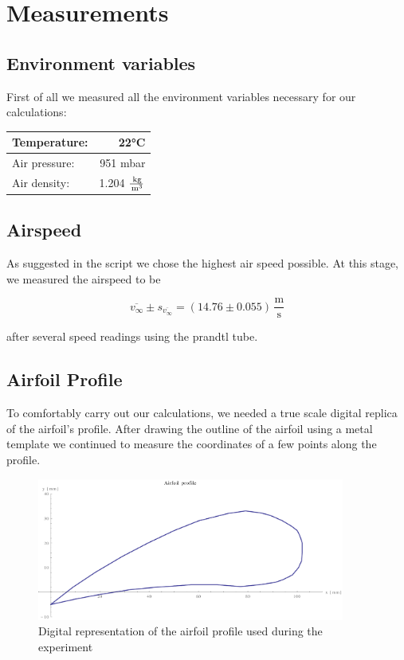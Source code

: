 \documentclass{scrreprt}
\newcommand{\unit}[1]{\ensuremath{\, \mathrm{#1}}}
\begin{document}
\section{Measurements}
\subsection{Environment variables}
First of all we measured all the environment variables necessary for our calculations:

\begin{table}[H]
\centering
\begin{tabular}{|l|r|}
\hline
Temperature: & \ang{22}C\\
\hline
Air pressure: & 951 mbar\\
\hline
Air density: & 1.204 $\tiny\frac{\unit{kg}}{\unit{m^3}}$\\
\hline
\end{tabular}
\end{table}

\subsection{Airspeed}
As suggested in the script we chose the highest air speed possible. At this stage, we measured the airspeed to be 

\[\overline{v_{\infty}}\pm s_{\overline{v_{\infty}}} = (14.76 \pm 0.055)\unit{\frac{m}{s}}\]

after several speed readings using the prandtl tube.

\subsection{Airfoil Profile}
To comfortably carry out our calculations, we needed a true scale digital replica of the airfoil's profile. After drawing the outline of the airfoil using a metal template we continued to measure the coordinates of a few points along the profile.

\begin{figure}[H]
	\centering
  \includegraphics[width=0.9\textwidth]{diag/wing_profile.pdf}
	\caption{Digital representation of the airfoil profile used during the experiment}
	\label{fig:profile}
\end{figure}
\end{document}
